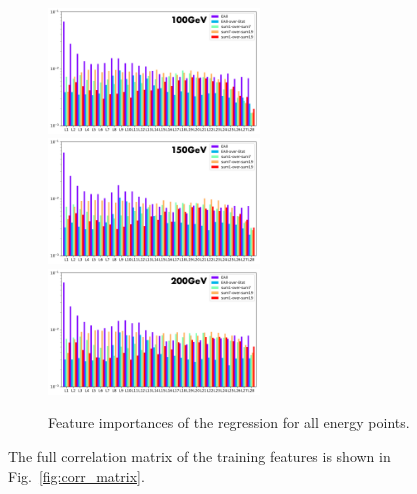 \begin{figure}[p]
\begin{center}
    \includegraphics[width=0.5\textwidth]{Fig/fig_HGCAL/Feature_importance_showershape_dynamicwindow_v2_100GeV}\\
    \includegraphics[width=0.5\textwidth]{Fig/fig_HGCAL/Feature_importance_showershape_dynamicwindow_v2_150GeV}~
    \includegraphics[width=0.5\textwidth]{Fig/fig_HGCAL/Feature_importance_showershape_dynamicwindow_v2_200GeV}\\
    \caption{Feature importances of the regression for all energy points.}
    \label{fig:featimp_EReco}
    \end{center}
\end{figure}

The full correlation matrix of the training features is shown in Fig.~\ref{fig:corr_matrix}.

